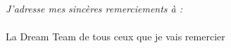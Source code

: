 \newpage
~ %

\newpage
\newpage
~ %

\newpage
{\rmfamily
~ \\ ~
\vspace{2cm}
{\itshape J'adresse mes sinc\`{e}res remerciements \`{a} :
\vspace{2cm}
\paragraph*{}
La Dream Team de tous ceux que je vais remercier
}
}
\newpage
~ %

\newpage %
